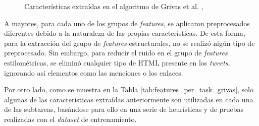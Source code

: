 {\bigskip
\begin{figure}[H]
	\centering
	\caption{Características extraídas en el algoritmo de Grivas et al. \cite{grivas2015author}, }
	\label{fig:features_grivas}
\end{figure}

\bigskip
A mayores, para cada uno de los grupos de \textit{features}, se aplicaron preprocesados diferentes debido a la naturaleza de las propias características. De esta forma, para la extracción del grupo de \textit{features}
estructurales, no se realizó nigún tipo de preprocesado. Sin embargo, para reducir el ruido en el grupo de \textit{features} estilométricas, se eliminó cualquier tipo de HTML presente en los \textit{tweets}, ignorando así
elementos como las menciones o los enlaces.

\bigskip
Por otro lado, como se muestra en la Tabla \ref{tab:features_per_task_grivas}, solo algunas de las características extraídas anteriormente son utilizadas en cada una de las subtareas, basándose
para ello en una serie de heurísticas y de pruebas realizadas con el \textit{dataset} de entrenamiento.

}

